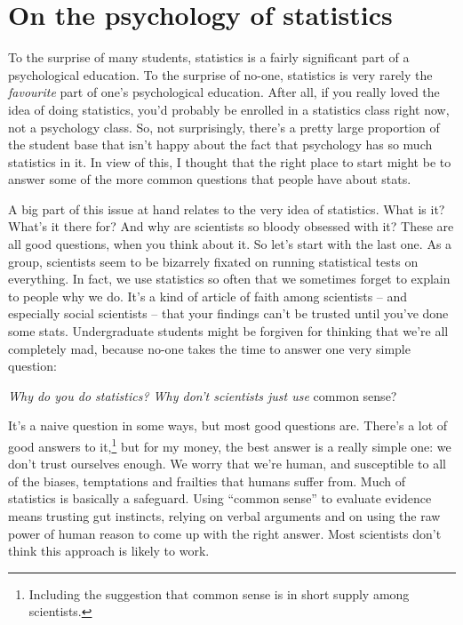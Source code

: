 \documentclass[
]{book}
\begin{document}
\hypertarget{on-the-psychology-of-statistics}{%
\section{On the psychology of statistics}\label{on-the-psychology-of-statistics}}

To the surprise of many students, statistics is a fairly significant part of a psychological education. To the surprise of no-one, statistics is very rarely the \emph{favourite} part of one's psychological education. After all, if you really loved the idea of doing statistics, you'd probably be enrolled in a statistics class right now, not a psychology class. So, not surprisingly, there's a pretty large proportion of the student base that isn't happy about the fact that psychology has so much statistics in it. In view of this, I thought that the right place to start might be to answer some of the more common questions that people have about stats.

A big part of this issue at hand relates to the very idea of statistics. What is it? What's it there for? And why are scientists so bloody obsessed with it? These are all good questions, when you think about it. So let's start with the last one. As a group, scientists seem to be bizarrely fixated on running statistical tests on everything. In fact, we use statistics so often that we sometimes forget to explain to people why we do. It's a kind of article of faith among scientists -- and especially social scientists -- that your findings can't be trusted until you've done some stats. Undergraduate students might be forgiven for thinking that we're all completely mad, because no-one takes the time to answer one very simple question:

\emph{Why do you do statistics? Why don't scientists just use} common sense?

It's a naive question in some ways, but most good questions are. There's a lot of good answers to it,\footnote{Including the suggestion that common sense is in short supply among scientists.} but for my money, the best answer is a really simple one: we don't trust ourselves enough. We worry that we're human, and susceptible to all of the biases, temptations and frailties that humans suffer from. Much of statistics is basically a safeguard. Using ``common sense'' to evaluate evidence means trusting gut instincts, relying on verbal arguments and on using the raw power of human reason to come up with the right answer. Most scientists don't think this approach is likely to work.
\end{document}
